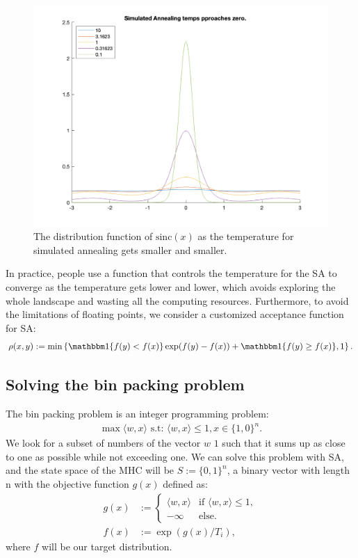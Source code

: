 \documentclass[]{article}
\theoremstyle{definition}
\begin{document}
        \begin{figure}[H]
            \centering 
            \includegraphics[width=14cm]{sa_temp.png}
            \caption{The distribution function of $\text{sinc}(x)$ as the temperature for simulated annealing gets smaller and smaller.}
            \label{fig:sa_temp}
        \end{figure}
        In practice, people use a function that controls the temperature for the SA to converge as the temperature gets lower and lower, which avoids exploring the whole landscape and wasting all the computing resources. Furthermore, to avoid the limitations of floating points, we consider a customized acceptance function for SA: 
        \begin{align*}
            \rho(x, y) := \min
            \left\lbrace
            \mathbbm 1 \{f(y) < f(x)\}\exp(f(y) - f(x)) + \mathbbm 1 \{f(y) \ge f(x)\}, 1
            \right\rbrace. 
        \end{align*}
\subsection{Solving the bin packing problem}
    The bin packing problem is an integer programming problem: 
    \begin{align*}
        \max \langle w, x\rangle \text{ s.t: } \langle w, x\rangle \le 1, x\in \{1, 0\}^n. 
    \end{align*}
    We look for a subset of numbers of the vector $w$ $1$ such that it sums up as close to one as possible while not exceeding one. We can solve this problem with SA, and the state space of the MHC will be $S:= \{0, 1\}^n$, a binary vector with length n with the objective function $g(x)$ defined as: 
    \begin{align*}
        g(x) &:= \begin{cases}
            \langle w, x\rangle & \text{if }\langle w, x\rangle\le 1,
            \\
            -\infty & \text{else}. 
        \end{cases}
        \\
        f(x) &:= \exp(g(x)/T_i), 
    \end{align*}
    where $f$ will be our target distribution. 
\end{document}

